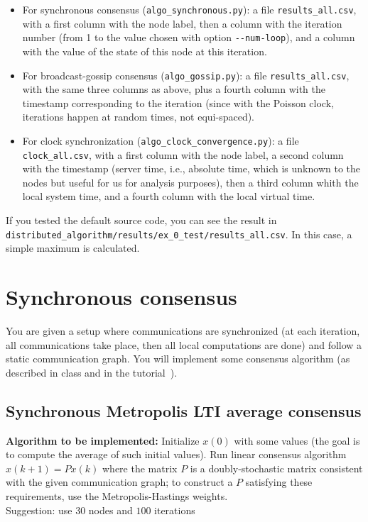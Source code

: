 \documentclass{article}
\begin{document}
\begin{itemize}
\item For synchronous consensus (\verb=algo_synchronous.py=):
a file \verb=results_all.csv=, with a first column with the node label, then a column with the iteration number (from 1 to the value chosen with option \verb=--num-loop=), and a column with the value of the state of this node at this iteration.
\item For broadcast-gossip consensus (\verb=algo_gossip.py=):
a file \verb=results_all.csv=, with the same three columns as above, plus a fourth column with the timestamp corresponding to the iteration (since with the Poisson clock, iterations happen at random times, not equi-spaced).
\item For clock synchronization (\verb=algo_clock_convergence.py=):
a file \verb=clock_all.csv=, with a first column with the node label, a second column with the timestamp (server time, i.e., absolute time, which is unknown to the nodes but useful for us for analysis purposes), then a third column whith the local system time, and a fourth column with the local virtual time.
\end{itemize}
If you tested the default source code, you can see the result in \verb=distributed_algorithm/results/ex_0_test/results_all.csv=.
In this case, a simple maximum is calculated.


\newpage

\newpage

\section{Synchronous consensus}
You are given a setup where communications are synchronized (at each iteration,
all communications take place, then all local computations are done) and follow a static communication graph.
You will implement some consensus algorithm (as described in class and in the tutorial~\cite{consensus-tutorial}).


\subsection{Synchronous Metropolis LTI average consensus}
\textbf{Algorithm to be implemented:}
Initialize $x(0)$ with some values (the goal is to compute the average of such initial values). Run linear consensus algorithm $x(k+1) = P x(k)$ where the matrix $P$ is a doubly-stochastic matrix consistent with the given communication graph; to construct a $P$ satisfying these requirements, use the Metropolis-Hastings weights. \\
Suggestion: use $30$ nodes and $100$ iterations
\end{document}
